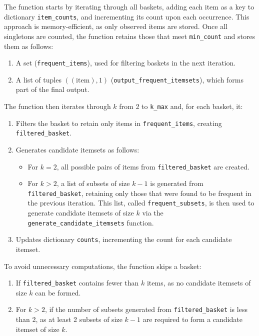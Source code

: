 \documentclass{Class/julia}
\begin{document}
The function starts by iterating through all baskets, adding each item as a key to dictionary \texttt{item\_counts}, and incrementing its count upon each occurrence. This approach is memory-efficient, as only observed items are stored. Once all singletons are counted, the function retains those that meet \texttt{min\_count} and stores them as follows:

\begin{enumerate}
\item A set (\texttt{frequent\_items}), used for filtering baskets in the next iteration.
\item A list of tuples \(((\text{item}), 1)\) (\texttt{output\_frequent\_itemsets}), which forms part of the final output.
\end{enumerate}

The function then iterates through \( k \) from 2 to \texttt{k\_max} and, for each basket, it:

\begin{enumerate}  
\item Filters the basket to retain only items in \texttt{frequent\_items}, creating \texttt{filtered\_basket}.
\item Generates candidate itemsets as follows:
  \begin{itemize}  
  \item For \( k = 2 \), all possible pairs of items from \texttt{filtered\_basket} are created.
  \item For \( k > 2 \), a list of subsets of size \( k-1 \) is generated from \texttt{filtered\_basket}, retaining only those that were found to be frequent in the previous iteration. This list, called \texttt{frequent\_subsets}, is then used to generate candidate itemsets of size \( k \) via the \texttt{generate\_candidate\_itemsets} function.
  \end{itemize}
\item Updates dictionary \texttt{counts}, incrementing the count for each candidate itemset.
\end{enumerate}

\noindent To avoid unnecessary computations, the function skips a basket:
\begin{enumerate}
    \item If \texttt{filtered\_basket} contains fewer than \( k \) items, as no candidate itemsets of size \( k \) can be formed.  
    \item For \( k > 2 \), if the number of subsets generated from \texttt{filtered\_basket} is less than 2, as at least 2 subsets of size \( k-1 \) are required to form a candidate itemset of size \( k \).
\end{enumerate}
\end{document}
